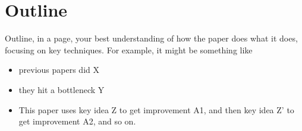 \section*{Outline}

\par
Outline, in a page, your best understanding of how the paper does what it
does, focusing on key techniques. For example, it might be something like

\begin{itemize}
\item previous papers did X
\item they hit a bottleneck Y
\item This paper uses key idea Z to get improvement A1, and then key idea Z' to get
improvement A2, and so on.
\end{itemize}

%

